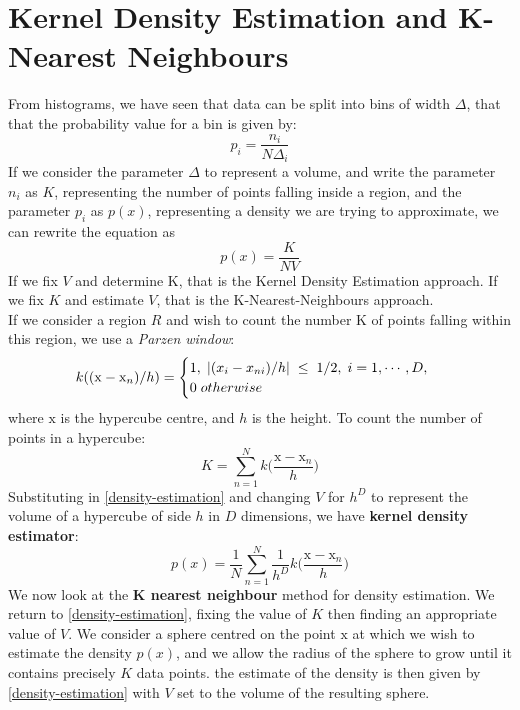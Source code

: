 \section{Kernel Density Estimation and K-Nearest Neighbours}
From histograms, we have seen that data can be split into bins of width $\Delta$, that that the probability value for a bin is given by:
$$
    p_i=\frac{n_i}{N\Delta_i}
$$
If we consider the parameter $\Delta$ to represent a volume, and write the parameter $n_i$ as $K$, representing the number of points falling inside a region, and the parameter $p_i$ as $p(x)$, representing a density we are trying to approximate, we can rewrite the equation as
\begin{equation}
    p(x)=\frac{K}{NV} \label{density-estimation}
\end{equation}
If we fix $V$ and determine K, that is the Kernel Density Estimation approach. If we fix $K$ and estimate $V$, that is the K-Nearest-Neighbours approach.\\
If we consider a region $R$ and wish to count the number K of points falling within this region, we use a \textit{Parzen window}:
$$
  k((\mathrm{x}-\mathrm{x}_n)/h) = \begin{cases}
               1,\hspace{1mm}|(x_i-x_{ni})/h|\hspace{1mm} \leq\hspace{1mm} 1/2, \hspace{1mm}i = 1,\cdots, D, \\
               0\hspace{1mm}otherwise
            \end{cases}
$$
where $\mathrm{x}$ is the hypercube centre, and $h$ is the height. To count the number of points in a hypercube:
\begin{equation}
K = \sum_{n=1}^Nk\bigg(\frac{\mathrm{x}-\mathrm{x}_n}{h}\bigg)
\end{equation}
Substituting in \ref{density-estimation} and changing $V$ for $h^D$ to represent the volume of a hypercube of side $h$ in $D$ dimensions, we have \textbf{kernel density estimator}:
\begin{equation}
    p(x) = \frac{1}{N}\sum_{n=1}^N \frac{1}{h^D} k\bigg(\frac{\mathrm{x}-\mathrm{x}_n}{h}\bigg)
\end{equation}
We now look at the \textbf{K nearest neighbour} method for density estimation. We return to \ref{density-estimation}, fixing the value of $K$ then finding an appropriate value of $V$. We consider a sphere centred on the point $\mathrm{x}$ at which we wish to estimate the density $p(x)$, and we allow the radius of the sphere to grow until it contains precisely $K$ data points. the estimate of the density is then given by \ref{density-estimation} with $V$ set to the volume of the resulting sphere.\\
